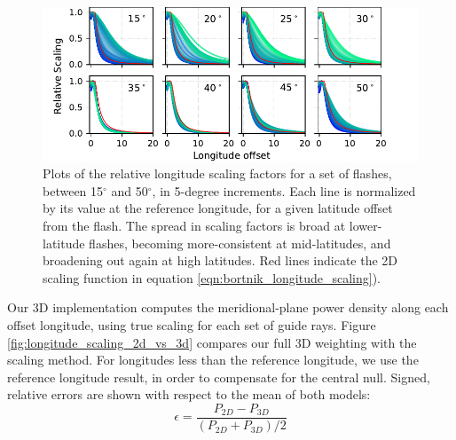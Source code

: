 \begin{figure}[h!]
\begin{center}
\includegraphics{figures/longitude_scaling_per_latitude.pdf}
\caption[Relative longitude scaling factors per latitude]{Plots of the relative longitude scaling factors for a set of flashes, between 15$^\circ$ and 50$^\circ$, in 5-degree increments. Each line is normalized by its value at the reference longitude, for a given latitude offset from the flash. The spread in scaling factors is broad at lower-latitude flashes, becoming more-consistent at mid-latitudes, and broadening out again at high latitudes. Red lines indicate the 2D scaling function in equation \eqref{eqn:bortnik_longitude_scaling}).}
\label{fig:longitude_scaling_per_latitude}
\end{center}
\end{figure}

Our 3D implementation computes the meridional-plane power density along each offset longitude, using true scaling for each set of guide rays. Figure \ref{fig:longitude_scaling_2d_vs_3d} compares our full 3D weighting with the \cite{Bortnik2005} scaling method. For longitudes less than the reference longitude, we use the reference longitude result, in order to compensate for the central null. Signed, relative errors are shown with respect to the mean of both models:
\begin{equation}
\epsilon = \frac{P_{2D} - P_{3D}}{(P_{2D} + P_{3D})/2}
\end{equation}

